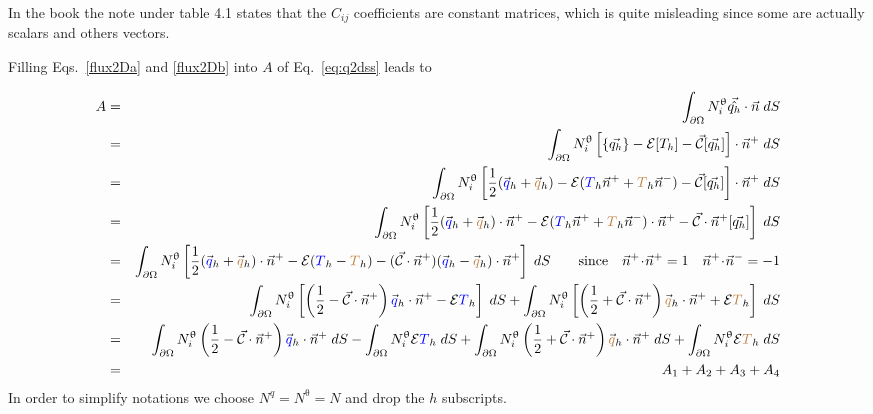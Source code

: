 \begin{itemize}
\begin{remark}
In the book the note under table 4.1 states that the $C_{ij}$ 
coefficients are constant matrices, which is quite misleading since some are actually scalars and others vectors.
\end{remark}

\end{itemize}


Filling Eqs.~\eqref{flux2Da} and \eqref{flux2Db} into $A$ of 
Eq.~\eqref{eq:q2dss} leads to

\begin{eqnarray}
A&=& \int_{\partial\Omega} N^\uptheta_i \vec{\hat{q_h}} \cdot \vec{n} \; dS \nonumber\\ 
&=&
\int_{\partial\Omega} N^\uptheta_i \left[ \{ \vec{q_h} \} -{\cal{E}} [T_h]- \vec{\cal{C}}  [\vec{q_h}] \right] \cdot \vec{n}^+ \; dS  \nonumber\\
&=&
\int_{\partial\Omega}{N^\uptheta_i} \left[ \frac{1}{2}(\vec{\color{blue}q}_h + \vec{\color{brown}q}_h) 
-{\cal{E}} ({\color{blue} T}_h \vec{n}^+ + {\color{brown} T}_h \vec{n}^-)- \vec{\cal{C}}  [\vec{q_h}] \right] \cdot \vec{n}^+ \; dS  \nonumber\\
&=&
\int_{\partial\Omega}{N^\uptheta_i} \left[ \frac{1}{2}(\vec{\color{blue}q}_h + \vec{\color{brown}q}_h)\cdot\vec{n}^+ 
  -{\cal{E}} ({\color{blue} T}_h \vec{n}^+ + {\color{brown} T}_h \vec{n}^-) \cdot \vec{n}^+
- \vec{\cal{C}} \cdot \vec{n}^+ [\vec{q_h}] \right] \; dS  \nonumber\\
&=&
\int_{\partial\Omega}{N^\uptheta_i} \left[ \frac{1}{2}(\vec{\color{blue}q}_h + \vec{\color{brown}q}_h)\cdot\vec{n}^+  -{\cal{E}} ({\color{blue} T}_h -{\color{brown} T}_h ) 
- (\vec{\cal{C}} \cdot \vec{n}^+) 
(\vec{\color{blue}q}_h - \vec{\color{brown}q}_h) \cdot \vec{n}^+
\right] \; dS  \qquad \text{since} \quad  \vec{n}^+\!\cdot\!\vec{n}^+ =1 \quad  \vec{n}^+\!\cdot\!\vec{n}^- =-1 \nonumber\\
&=&
\int_{\partial\Omega}{N^\uptheta_i} \left[
\left(\frac{1}{2} - \vec{\cal{C}} \cdot \vec{n}^+ \right) \vec{\color{blue}q}_h\cdot\vec{n}^+
- {\cal{E}} {\color{blue} T}_h
\right] \; dS 
+ 
\int_{\partial\Omega}{N^\uptheta_i} \left[
\left(\frac{1}{2} + \vec{\cal{C}} \cdot \vec{n}^+ \right)
\vec{\color{brown}q}_h \cdot\vec{n}^+
+ {\cal{E}} {\color{brown} T}_h
\right] \; dS  \nonumber \\
&=&
\int_{\partial\Omega}{N^\uptheta_i} 
\left(\frac{1}{2} - \vec{\cal{C}} \cdot \vec{n}^+ \right) \vec{\color{blue}q}_h\cdot\vec{n}^+ \; dS 
- \int_{\partial\Omega}{N^\uptheta_i}  {\cal{E}} {\color{blue} T}_h  \; dS 
+ 
\int_{\partial\Omega}{N^\uptheta_i} \left(\frac{1}{2} + \vec{\cal{C}} \cdot \vec{n}^+ \right)
\vec{\color{brown}q}_h \cdot\vec{n}^+   \; dS
+
\int_{\partial\Omega}{N^\uptheta_i}   {\cal{E}} {\color{brown} T}_h   \; dS  \nonumber \\
&=& A_1 + A_2 + A_3 + A_4 
\end{eqnarray}
In order to simplify notations we choose $N^q=N^\uptheta=N$ and drop the $h$ subscripts.

